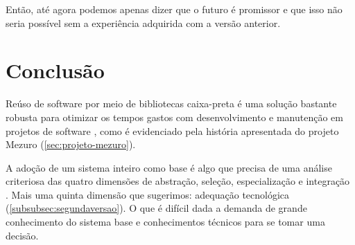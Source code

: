 \documentclass[12pt]{article}
\begin{document}
    Então, até agora podemos apenas dizer que o futuro é promissor e que isso não seria possível sem a experiência adquirida com a versão anterior.

\section{Conclusão} \label{sec:conclusao}
Reúso de software por meio de bibliotecas caixa-preta é uma solução bastante robusta para otimizar os tempos gastos com desenvolvimento e manutenção em projetos de software \cite{hdghi11}, como é evidenciado pela história apresentada do projeto Mezuro (\ref{sec:projeto-mezuro}).

A adoção de um sistema inteiro como base é algo que precisa de uma análise criteriosa das quatro dimensões de abstração, seleção, especialização e integração \cite{k92}. Mais uma quinta dimensão que sugerimos: adequação tecnológica (\ref{subsubsec:segundaversao}). O que é difícil dada a demanda de grande conhecimento do sistema base e conhecimentos técnicos para se tomar uma decisão.



\end{document}
